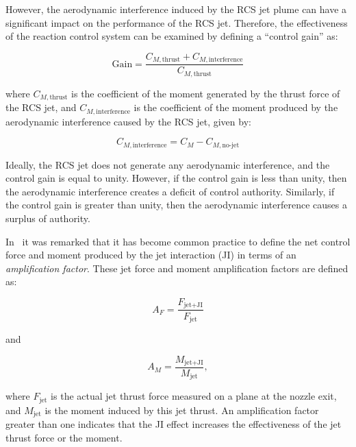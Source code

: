 \documentclass[12pt]{article}
\begin{document}
However, the aerodynamic interference induced by the RCS jet plume can have a significant impact on the performance of the RCS jet. Therefore, the effectiveness of the reaction control system can be examined by defining a ``control gain'' as:

\begin{equation}
\text{Gain} = \frac{C_{M,\text{thrust}} + C_{M,\text{interference}}}{C_{M,\text{thrust}}}
\label{eq:control_gain_2}
\end{equation}

where $ C_{M,\text{thrust}} $ is the coefficient of the moment generated by the thrust force of the RCS jet, and $ C_{M,\text{interference}} $ is the coefficient of the moment produced by the aerodynamic interference caused by the RCS jet, given by:

\begin{equation}
C_{M,\text{interference}} = C_M - C_{M,\text{no-jet}}
\label{eq:Cm_interference_2}
\end{equation}

Ideally, the RCS jet does not generate any aerodynamic interference, and the control gain is equal to unity. However, if the control gain is less than unity, then the aerodynamic interference creates a deficit of control authority. Similarly, if the control gain is greater than unity, then the aerodynamic interference causes a surplus of authority.

In~\cite{despirito2011factors} it was remarked that it has become common practice to define the net control force and moment produced by the jet interaction (JI) in terms of an \emph{amplification factor}. These jet force and moment amplification factors are defined as:

\begin{equation}
    A_F = \frac{F_{\text{jet+JI}}}{F_{\text{jet}}}
    \label{eq:AF}
\end{equation}

and

\begin{equation}
    A_M = \frac{M_{\text{jet+JI}}}{M_{\text{jet}}},
    \label{eq:AM}
\end{equation}

where $ F_{\text{jet}} $ is the actual jet thrust force measured on a plane at the nozzle exit, and $ M_{\text{jet}} $ is the moment induced by this jet thrust. An amplification factor greater than one indicates that the JI effect increases the effectiveness of the jet thrust force or the moment.
\end{document}

